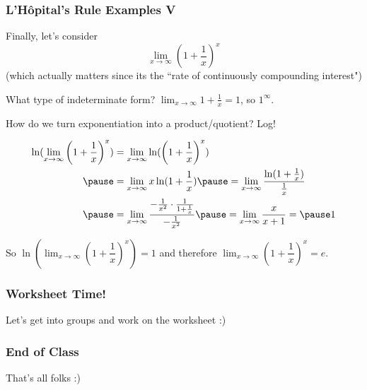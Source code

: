 \documentclass{ltx-talk}
\begin{document}
\begin{frame}
  \frametitle{L'Hôpital's Rule Examples V}
  Finally, let's consider
  \begin{equation}
    \lim_{x \rightarrow \infty} \left(1 + \dfrac{1}{x}\right)^x
  \end{equation}
  (which actually matters since its the ``rate of continuously compounding interest") \pause
  
  What type of indeterminate form? \pause $\lim_{x \rightarrow \infty} 1 + \frac{1}{x} = 1$, so \pause $1^\infty$.

  How do we turn exponentiation into a product/quotient? \pause Log!

  \begin{align}
    \ln(\lim_{x \rightarrow \infty} \left(1 + \dfrac{1}{x}\right)^x) &= \lim_{x \rightarrow \infty} \ln(\left(1 + \dfrac{1}{x}\right)^x) \\ \pause
                                                                     &= \lim_{x \rightarrow \infty} x \ln(1 + \frac{1}{x}) \pause = \lim_{x \rightarrow \infty} \dfrac{\ln(1 + \frac{1}{x})}{\frac{1}{x}} \\ \pause
                                                                     &= \lim\limits_{x \rightarrow \infty} \dfrac{-\frac{1}{x^2} \cdot \frac{1}{1 + \frac{1}{x}}}{-\frac{1}{x^2}} \pause = \lim_{x \rightarrow \infty} \dfrac{x}{x + 1} = \pause 1
  \end{align} \pause

  So $\ln\left(\lim_{x \rightarrow \infty} \left( 1 + \dfrac{1}{x}\right)^x \right) = 1$ and therefore \pause $\lim_{x \rightarrow \infty} \left(1 + \dfrac{1}{x}\right)^x = e$.
\end{frame}

\begin{frame}
  \frametitle{Worksheet Time!}

  Let's get into groups and work on the worksheet :)
\end{frame}

\begin{frame}
  \frametitle{End of Class}

  That's all folks :)
\end{frame}
\end{document}
